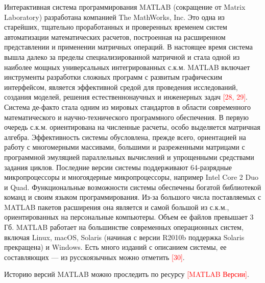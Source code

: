 Интерактивная система программирования MATLAB (сокращение от Matrix Laboratory) разработана компанией The MathWorks, Inc. Это одна из старейших, тщательно проработанных и проверенных временем систем автоматизации математических расчетов, построенная на расширенном представлении и применении матричных операций. В настоящее время система вышла далеко за пределы специализированной матричной и стала одной из наиболее мощных универсальных интегрированных с.к.м. MATLAB включает инструменты разработки сложных программ с развитым графическим интерфейсом, является эффективной средой для проведения исследований, создания моделей, решения естественнонаучных и инженерных задач \textcolor{red}{[28, 29]}. Система де-факто стала одним из мировых стандартов в области современного математического и научно-технического программного обеспечения. В первую очередь с.к.м. ориентирована на численные расчеты, особо выделяется матричная алгебра. Эффективность системы обусловлена, прежде всего, ориентацией на работу с многомерными массивами, большими и разреженными матрицами с программной эмуляцией параллельных вычислений и упрощенными средствами задания циклов. Последние версии системы поддерживают 64-разрядные микропроцессоры и многоядерные микропроцессоры, например Intel Core 2 Duo и Quad. Функциональные возможности системы обеспечены богатой библиотекой команд и своим языком программирования. Из-за большого числа поставляемых с MATLAB пакетов расширения она является и самой большой из с.к.м., ориентированных на персональные компьютеры. Объем ее файлов превышает 3 Гб. 
MATLAB работает на большинстве современных операционных систем, включая Linux, macOS, Solaris (начиная с версии R2010b поддержка Solaris прекращена) и Windows. 
Есть много изданий с описанием системы, ее составляющих --- из русскоязычных можно отметить \textcolor{red}{[30]}. 

Историю версий MATLAB можно проследить по ресурсу \textcolor{red}{[MATLAB Версии]}.

